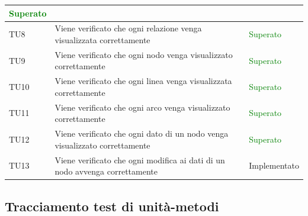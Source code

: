 \documentclass[openany,12pt,a4paper]{report}
\begin{document}
\begin{longtable}{| p{2.5cm} |p{8cm} | p{2.5cm} |}
	\newline \textcolor{green}{Superato}
	\\[1em]
	\hline
	\newline TU8&
	\newline Viene verificato che ogni relazione venga visualizzata correttamente&
	\newline \textcolor{green}{Superato}
	\\[1em]
	\hline
	\newline TU9&
	\newline Viene verificato che ogni nodo venga visualizzato correttamente&
	\newline \textcolor{green}{Superato}
	\\[1em]
	\hline
	\newline TU10&
	\newline Viene verificato che ogni linea venga visualizzata correttamente&
	\newline \textcolor{green}{Superato}
	\\[1em]
	\hline
	\newline TU11&
	\newline Viene verificato che ogni arco venga visualizzato correttamente&
	\newline \textcolor{green}{Superato}
	\\[1em]
	\hline
	\newline TU12&
	\newline Viene verificato che ogni dato di un nodo venga visualizzato correttamente&
	\newline \textcolor{green}{Superato}
	\\[1em]
	\hline
	\newline TU13&
	\newline Viene verificato che ogni modifica ai dati di un nodo avvenga correttamente&
	\newline Implementato
	\\[1em]
	\hline
\end{longtable}

\subsection{Tracciamento test di unità-metodi}
\end{document}
